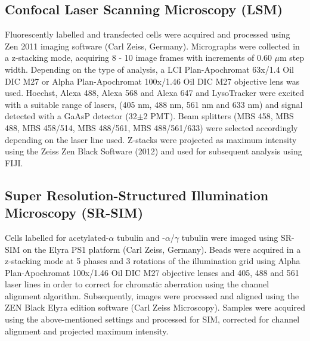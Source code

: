 \subsection{Confocal Laser Scanning Microscopy (LSM)}
Fluorescently labelled and transfected cells were acquired and processed using Zen 2011 imaging software (Carl Zeiss, Germany). Micrographs were collected in a z-stacking mode, acquiring 8 - 10 image frames with increments of 0.60 $\mu$m step width. Depending on the type of analysis, a LCI Plan-Apochromat 63x/1.4 Oil DIC M27 or Alpha Plan-Apochromat 100x/1.46 Oil DIC M27 objective lens was used. Hoechst, Alexa 488, Alexa 568 and Alexa 647 and LysoTracker were excited with a suitable range of lasers, (405 nm, 488 nm, 561 nm and 633 nm) and signal detected with a GaAsP detector (32$\pm$2 PMT). Beam splitters (MBS 458, MBS 488, MBS 458/514, MBS 488/561, MBS 488/561/633) were selected accordingly depending on the laser line used. Z-stacks were projected as maximum intensity using the Zeiss Zen Black Software (2012) and used for subsequent analysis using FIJI.

\subsection{Super Resolution-Structured Illumination Microscopy (SR-SIM)}
Cells labelled for acetylated-$\alpha$ tubulin and -$\alpha$/$\gamma$ tubulin were imaged using SR-SIM on the Elyra PS1 platform (Carl Zeiss, Germany). Beads were acquired in a z-stacking mode at 5 phases and 3 rotations  of the illumination grid using Alpha Plan-Apochromat 100x/1.46 Oil DIC M27 objective lenses and 405, 488 and 561 laser lines in order to correct for chromatic aberration using the channel alignment algorithm. Subsequently, images were processed and aligned using the ZEN Black Elyra edition software (Carl Zeiss Microscopy). Samples were acquired using the above-mentioned settings and processed for SIM, corrected for channel alignment and projected maximum intensity. 

